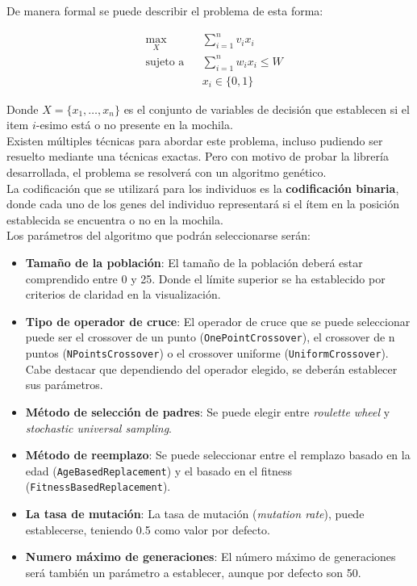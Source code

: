 De manera formal se puede describir el problema de esta forma:

\begin{equation*}
\begin{aligned}
& \underset{X}{\text{max}}
& & \sum_{i=1}^n v_i x_i \\
& \text{sujeto a}
& & \sum_{i=1}^n w_i x_i \leq W \\
&&& x_i \in \{0, 1\}
\end{aligned}
\end{equation*}

Donde $X = \{x_1, \dots, x_n\}$ es el conjunto de variables de decisión que establecen si el item $i$-esimo está o no presente en la mochila. \\

Existen múltiples técnicas para abordar este problema, incluso pudiendo ser resuelto mediante una técnicas exactas. Pero con motivo de probar la librería desarrollada, el problema se resolverá con un algoritmo genético. \\

La codificación que se utilizará para los individuos es la \textbf{codificación binaria}, donde cada uno de los genes del individuo representará si el ítem en la posición establecida se encuentra o no en la mochila. \\

Los parámetros del algoritmo que podrán seleccionarse serán:

\begin{itemize}
    \item \textbf{Tamaño de la población}: El tamaño de la población deberá estar comprendido entre 0 y 25. Donde el límite superior se ha establecido por criterios de claridad en la visualización.
    \item \textbf{Tipo de operador de cruce}: El operador de cruce que se puede seleccionar puede ser el crossover de un punto (\texttt{OnePointCrossover}), el crossover de n puntos (\texttt{NPointsCrossover}) o el crossover uniforme (\texttt{UniformCrossover}). Cabe destacar que dependiendo del operador elegido, se deberán establecer sus parámetros.
    \item \textbf{Método de selección de padres}: Se puede elegir entre \textit{roulette wheel} y \textit{stochastic universal sampling}.
    \item \textbf{Método de reemplazo}: Se puede seleccionar entre el remplazo basado en la edad (\texttt{AgeBasedReplacement}) y el basado en el fitness (\texttt{FitnessBasedReplacement}).
    \item \textbf{La tasa de mutación}: La tasa de mutación (\textit{mutation rate}), puede establecerse, teniendo 0.5 como valor por defecto.
    \item \textbf{Numero máximo de generaciones}: El número máximo de generaciones será también un parámetro a establecer, aunque por defecto son 50.
\end{itemize}

